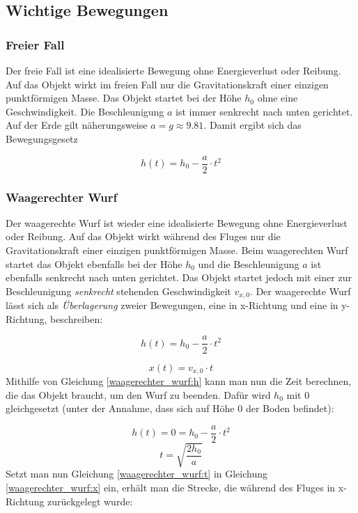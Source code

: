 \documentclass[a4paper]{article}
\begin{document}
		\subsection{Wichtige Bewegungen}
			\subsubsection{Freier Fall}
				Der freie Fall ist eine idealisierte Bewegung ohne Energieverlust oder Reibung. Auf das Objekt wirkt im freien Fall nur die Gravitationskraft einer einzigen punktförmigen Masse. Das Objekt startet bei der Höhe $h_0$ ohne eine Geschwindigkeit. Die Beschleunigung $a$ ist immer senkrecht nach unten gerichtet. Auf der Erde gilt näherungsweise $a=g\approx9.81$. Damit ergibt sich das Bewegungsgesetz
				
				\begin{equation}
					h(t) = h_0 - \frac{a}{2}\cdot t^2
				\end{equation}
			
			\subsubsection{Waagerechter Wurf}
				Der waagerechte Wurf ist wieder eine idealisierte Bewegung ohne Energieverlust oder Reibung. Auf das Objekt wirkt während des Fluges nur die Gravitationskraft einer einzigen punktförmigen Masse. Beim waagerechten Wurf startet das Objekt ebenfalls bei der Höhe $h_0$ und die Beschleunigung $a$ ist ebenfalls senkrecht nach unten gerichtet. Das Objekt startet jedoch mit einer zur Beschleunigung \textit{senkrecht} stehenden Geschwindigkeit $v_{x,0}$. Der waagerechte Wurf lässt sich als \textit{Überlagerung} zweier Bewegungen, eine in x-Richtung und eine in y-Richtung, beschreiben:
				
				\begin{equation}\label{waagerechter_wurf:h}
					h(t) = h_0 - \frac{a}{2}\cdot t^2
				\end{equation}
				
				\begin{equation}\label{waagerechter_wurf:x}
					x(t) = v_{x,0}\cdot t
				\end{equation}
				Mithilfe von Gleichung \ref{waagerechter_wurf:h} kann man nun die Zeit berechnen, die das Objekt braucht, um den Wurf zu beenden. Daf\"ur wird $h_0$ mit $0$ gleichgesetzt (unter der Annahme, dass sich auf Höhe $0$ der Boden befindet):
				
				\begin{equation}
					h(t) = 0 =  h_0 - \frac{a}{2}\cdot t^2
				\end{equation}
				\begin{equation}\label{waagerechter_wurf:t}
					t = \sqrt{\frac{2h_0}{a}}
				\end{equation}
				Setzt man nun Gleichung \ref{waagerechter_wurf:t} in Gleichung \ref{waagerechter_wurf:x} ein, erhält man die Strecke, die während des Fluges in x-Richtung zur\"uckgelegt wurde:
			
\end{document}
